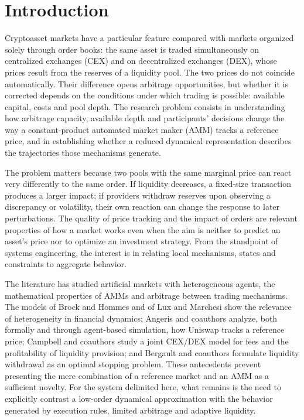 \chapter{Introduction}
\label{cap:introduccion}

Cryptoasset markets have a particular feature compared with markets organized solely through order books: the same asset is traded simultaneously on centralized exchanges (CEX) and on decentralized exchanges (DEX), whose prices result from the reserves of a liquidity pool. The two prices do not coincide automatically. Their difference opens arbitrage opportunities, but whether it is corrected depends on the conditions under which trading is possible: available capital, costs and pool depth. The research problem consists in understanding how arbitrage capacity, available depth and participants' decisions change the way a constant-product automated market maker (AMM) tracks a reference price, and in establishing whether a reduced dynamical representation describes the trajectories those mechanisms generate.

The problem matters because two pools with the same marginal price can react very differently to the same order. If liquidity decreases, a fixed-size transaction produces a larger impact; if providers withdraw reserves upon observing a discrepancy or volatility, their own reaction can change the response to later perturbations. The quality of price tracking and the impact of orders are relevant properties of how a market works even when the aim is neither to predict an asset's price nor to optimize an investment strategy. From the standpoint of systems engineering, the interest is in relating local mechanisms, states and constraints to aggregate behavior.

The literature has studied artificial markets with heterogeneous agents, the mathematical properties of AMMs and arbitrage between trading mechanisms. The models of Brock and Hommes \cite{brock1998heterogeneous} and of Lux and Marchesi \cite{lux1999scaling} show the relevance of heterogeneity in financial dynamics; Angeris and coauthors \cite{angeris2020uniswap} analyze, both formally and through agent-based simulation, how Uniswap tracks a reference price; Campbell and coauthors \cite{campbell2025optimal} study a joint CEX/DEX model for fees and the profitability of liquidity provision; and Bergault and coauthors \cite{bergault2025exit} formulate liquidity withdrawal as an optimal stopping problem. These antecedents prevent presenting the mere combination of a reference market and an AMM as a sufficient novelty. For the system delimited here, what remains is the need to explicitly contrast a low-order dynamical approximation with the behavior generated by execution rules, limited arbitrage and adaptive liquidity.


